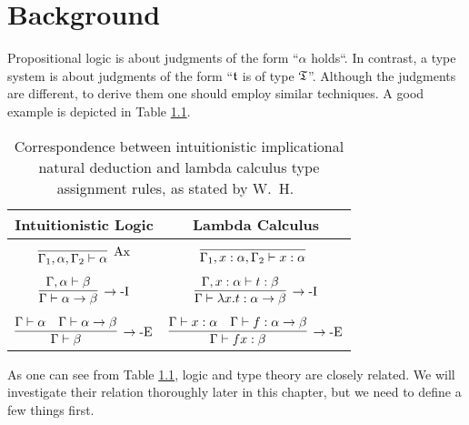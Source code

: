 \chapter{Background}\label{chap:background}

Propositional logic is about judgments of the form ``$\alpha$ holds``. In contrast, a type system is about judgments of the form ``$\mathfrak{t}$ is of type $\mathfrak{T}$''. Although the judgments are different, to derive them one should employ similar techniques. A good example is depicted in Table \ref{tab:natural-deduction-lambda-calculus-correspondence}.

\begin{table}[!ht]
    \centering
    \begin{tabular}{c|c}
        Intuitionistic Logic & Lambda Calculus \\
        \hline \\
        $\infer[\mbox{Ax}]{\Gamma_1, \alpha, \Gamma_2 \vdash \alpha}{}$ & $\infer[]{\Gamma_1, x : \alpha, \Gamma_2 \vdash x : \alpha}{}$ \\ \\
        $\infer[\rightarrow\mbox{-I}]{\Gamma \vdash \alpha \rightarrow \beta}{\Gamma, \alpha \vdash \beta}$ & $\infer[\rightarrow\mbox{-I}]{\Gamma \vdash \lambda x. t : \alpha \rightarrow \beta}{\Gamma, x : \alpha \vdash t : \beta}$ \\ \\
        $\infer[\rightarrow\mbox{-E}]{\Gamma \vdash \beta}{\Gamma \vdash \alpha & \Gamma \vdash \alpha \rightarrow \beta}$ & $\infer[\rightarrow\mbox{-E}]{\Gamma \vdash f x : \beta}{\Gamma \vdash x : \alpha & \Gamma \vdash f : \alpha \rightarrow \beta}$
    \end{tabular}
    \caption{Correspondence between 
intuitionistic implicational natural deduction and lambda calculus type assignment rules, as stated by W.~H.~\cite{Howard1969TheFN}}
    \label{tab:natural-deduction-lambda-calculus-correspondence}
\end{table}

As one can see from Table \ref{tab:natural-deduction-lambda-calculus-correspondence}, logic and type theory are closely related. We will investigate their relation thoroughly later in this chapter, but we need to define a few things first.




